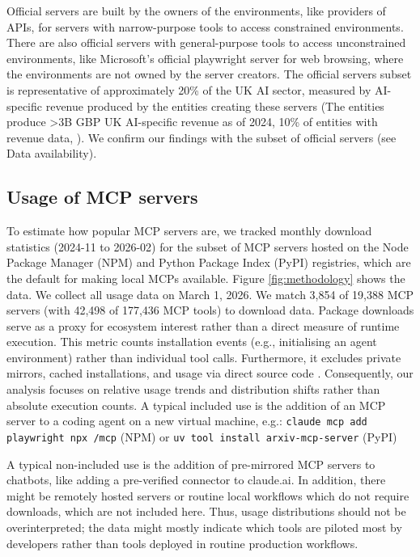 \documentclass[manuscript,screen,nonacm,oneside]{acmart}
\begin{document}
Official servers are built by the owners of the environments, like providers of APIs, for servers with narrow-purpose tools to access constrained environments. There are also official servers with general-purpose tools to access unconstrained environments, like Microsoft's official playwright server for web browsing, where the environments are not owned by the server creators. The official servers subset is representative of approximately 20\% of the UK AI sector, measured by AI-specific revenue produced by the entities creating these servers (The entities produce \textgreater3B GBP UK AI-specific revenue as of 2024, 10\% of entities with revenue data, \citep{undefinedArtificialIntelligence}). We confirm our findings with the subset of official servers (see Data availability).

\subsection{Usage of MCP servers}
\label{sec:usage-mcp}

To estimate how popular MCP servers are, we tracked monthly download statistics (2024-11 to 2026-02) for the subset of MCP servers hosted on the Node Package Manager (NPM) and Python Package Index (PyPI) registries, which are the default for making local MCPs available. Figure \ref{fig:methodology} shows the data. We collect all usage data on March 1, 2026. We match 3,854 of 19,388 MCP servers (with 42,498 of 177,436 MCP tools) to download data. Package downloads serve as a proxy for ecosystem interest rather than a direct measure of runtime execution. This metric counts installation events (e.g., initialising an agent environment) rather than individual tool calls. Furthermore, it excludes private mirrors, cached installations, and usage via direct source code \citep{npmjsBlogArchive}. Consequently, our analysis focuses on relative usage trends and distribution shifts rather than absolute execution counts. A typical included use is the addition of an MCP server to a coding agent on a new virtual machine, e.g.: \texttt{claude mcp add playwright npx \textquotesingle\@playwright/mcp\@latest\textquotesingle{}} (NPM) or \texttt{uv tool install arxiv-mcp-server} (PyPI)

A typical non-included use is the addition of pre-mirrored MCP servers to chatbots, like adding a pre-verified connector to claude.ai. In addition, there might be remotely hosted servers or routine local workflows which do not require downloads, which are not included here. Thus, usage distributions should not be overinterpreted; the data might mostly indicate which tools are piloted most by developers rather than tools deployed in routine production workflows.
\end{document}
